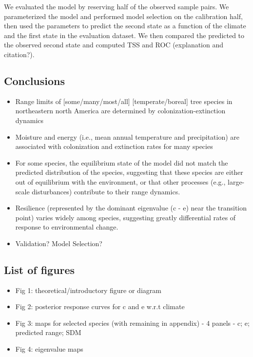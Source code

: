\documentclass[11pt]{article}
\begin{document}
We evaluated the model by reserving half of the observed sample pairs.
We parameterized the model and performed model selection on the calibration half, then used the parameters to predict the second state as a function of the climate and the first state in the evaluation dataset.
We then compared the predicted to the observed second state and computed TSS and ROC (explanation and citation?).






\subsection*{Conclusions}
\begin{itemize}
	\item Range limits of [some/many/most/all] [temperate/boreal] tree species in northeastern north America are determined by colonization-extinction dynamics
	\item Moisture and energy (i.e., mean annual temperature and precipitation) are associated with colonization and extinction rates for many species
	\item For some species, the equilibrium state of the model did not match the predicted distribution of the species, suggesting that these species are either out of equilibrium with the environment, or that other processes (e.g., large-scale disturbances) contribute to their range dynamics.
	\item Resilience (represented by the dominant eigenvalue (c - e) near the transition point) varies widely among species, suggesting greatly differential rates of response to environmental change.
	\item Validation? Model Selection?
\end{itemize}


\subsection*{List of figures}
\begin{itemize}
	\item Fig 1: theoretical/introductory figure or diagram
	\item Fig 2: posterior response curves for c and e w.r.t climate
	\item Fig 3: maps for selected species (with remaining in appendix) - 4 panels - c; e; predicted range; SDM
	\item Fig 4: eigenvalue maps
\end{itemize}
\end{document}
